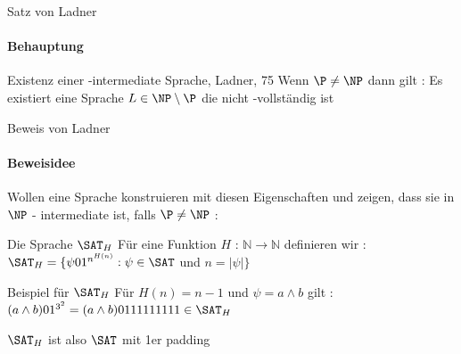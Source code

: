\begin{frame}{Satz von Ladner}
	\framesubtitle{Behauptung}
	\begin{KITinfoblock}{Existenz einer \NP -intermediate Sprache, Ladner, 75}
	Wenn $\P \neq \NP$ dann gilt : \newline
	Es existiert eine Sprache $L \in \NP \setminus \P$ die nicht \NP -vollständig ist
	\end{KITinfoblock}
\end{frame}
\begin{frame}{Beweis von Ladner}
	\framesubtitle{Beweisidee}
	Wollen eine Sprache konstruieren mit diesen Eigenschaften und zeigen, dass sie in $\NP$ - intermediate ist, falls $\P \neq \NP$  :
	
	\bigskip
	\pause
	\begin{KITinfoblock}{Die Sprache ${\SAT}_H$}
		Für eine Funktion $H$ : $\mathbb{N} \rightarrow \mathbb{N}$ definieren wir : \newline 	
		${\SAT}_H = \lbrace \psi 01^{n^{H(n)}} : \psi \in \SAT$ und $ n = |\psi| \rbrace$
	\end{KITinfoblock}
	\bigskip
	\pause	
	
	\begin{KITexampleblock}{Beispiel für ${\SAT}_H$}
	F\"ur $H(n) = n - 1$ und $\psi = a \land b$ gilt : \newline
	$(a \land b) 01^{3^2} = (a \land b) 0111111111 \in {\SAT}_H $
	\end{KITexampleblock}
	\pause
	\bigskip
	${\SAT}_H$ ist also $\SAT$ mit 1er padding
\end{frame}

